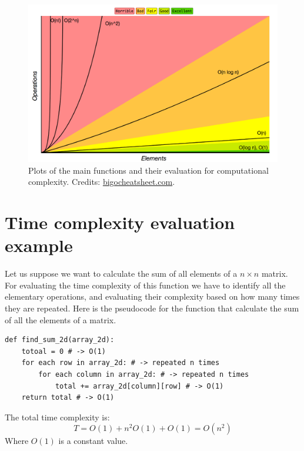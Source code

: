 \begin{figure}[hb]
	\begin{center}
		\includegraphics[scale=0.3]{chapters/introduction/images/big_o_plots.png}
		\caption[Plots of the main functions and their evaluation for computational complexity.]{Plots of the main functions and their evaluation for computational complexity. Credits: \href{https://www.bigocheatsheet.com/}{bigocheatsheet.com}.}
		\label{fig:bigoplots}
	\end{center}
\end{figure}

\section{Time complexity evaluation example}
Let us suppose we want to calculate the sum of all elements of a \(n\times n\) matrix. For evaluating the time complexity of this function we have to identify all the elementary operations, and evaluating their complexity based on how many times they are repeated. Here is the pseudocode for the function that calculate the sum of all the elements of a matrix.

\begin{lstlisting}[firstnumber=1, caption={Sum of all elements of a matrix.}]
def find_sum_2d(array_2d):
	totoal = 0 # -> O(1)
	for each row in array_2d: # -> repeated n times
		for each column in array_2d: # -> repeated n times
			total += array_2d[column][row] # -> O(1)
	return total # -> O(1)
\end{lstlisting}

The total time complexity is: 
\[T = O(1) + n^{2}O(1) + O(1) = O(n^{2}) \]
Where \(O(1)\) is a constant value.

